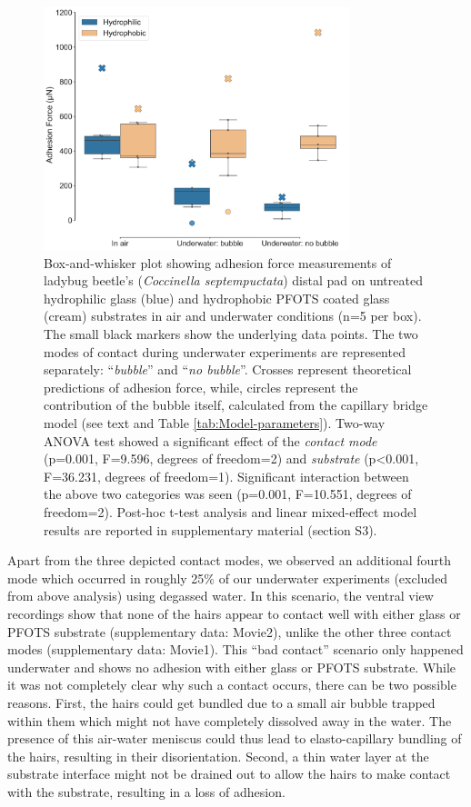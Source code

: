 \documentclass[vruler,JEB]{COB}%
\begin{document}
\begin{figure}
\includegraphics[width=3.5in]{Figure2-Expt_effect_of_contact}\caption{\label{fig:Effect-of-contact}Box-and-whisker plot showing
 adhesion force measurements of ladybug beetle's (\emph{Coccinella
septempuctata}) distal pad on untreated hydrophilic glass (blue) and hydrophobic PFOTS coated glass (cream) substrates in air and underwater
conditions (n=5 per box). The small black markers show the underlying data points. The two modes of contact during underwater experiments
are represented separately: \textquotedblleft\emph{bubble}\textquotedblright{}
and \textquotedblleft\emph{no bubble}\textquotedblright. Crosses
represent theoretical predictions of adhesion force, while, circles
represent the contribution of the bubble itself, calculated from the
capillary bridge model (see text and Table \ref{tab:Model-parameters}). Two-way ANOVA test showed a significant effect of the \emph{contact mode} (p=0.001, F=9.596, degrees of freedom=2) and \emph{substrate} (p<0.001, F=36.231, degrees of freedom=1). Significant interaction between the above two categories was seen (p=0.001, F=10.551, degrees of freedom=2). Post-hoc t-test analysis and linear mixed-effect model results are reported in supplementary material (section S3). }
\end{figure}

Apart from the three depicted contact modes, we observed an additional
fourth mode which occurred in roughly 25\% of our underwater experiments (excluded from above analysis) using degassed water.
In this scenario, the ventral view recordings show that none of the hairs
appear to contact well with either glass or PFOTS substrate (supplementary data: Movie2), unlike the other
three contact modes (supplementary data: Movie1). This ``bad contact'' scenario only happened underwater and shows no adhesion 
with either glass or PFOTS substrate. While it was not completely
clear why such a contact occurs, there can be two possible reasons.
First, the hairs could get bundled due to a small air bubble trapped within
them which might not have completely dissolved away in the water.
The presence of this air-water meniscus could thus lead to elasto-capillary bundling of the hairs, resulting in their disorientation. Second, a thin water
layer at the substrate interface might not be drained out to allow
the hairs to make contact with the substrate, resulting in a loss
of adhesion.
\end{document}
